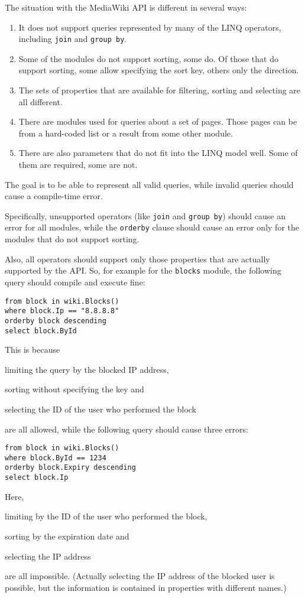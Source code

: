 The situation with the MediaWiki \ac{API} is different in several ways:

\begin{enumerate}
\item It does not support queries represented by many of the LINQ operators, including \lstinline{join} and \lstinline{group by}.
\item Some of the modules do not support sorting, some do. Of those that do support sorting, some allow specifying the sort key, others only the direction.
\item The sets of properties that are available for filtering, sorting and selecting are all different.
\item There are modules used for queries about a set of pages. Those pages can be from a hard-coded list or a result from some other module.
\item There are also parameters that do not fit into the LINQ model well. Some of them are required, some are not.
\end{enumerate}

The goal is to be able to represent all valid queries, while invalid queries should cause a compile-time error.

Specifically, unsupported operators (like \lstinline{join} and \lstinline{group by}) should cause an error for all modules,
while the \lstinline{orderby} clause should cause an error only for the modules that do not support sorting.

Also, all operators should support only those properties that are actually supported by the \ac{API}.
So, for example for the \verb,blocks, module, the following query should compile and execute fine:

\begin{lstlisting}
from block in wiki.Blocks()
where block.Ip == "8.8.8.8"
orderby block descending
select block.ById
\end{lstlisting}

This is because
\begin{compactitem}
\item limiting the query by the blocked \ac{IP} address,
\item sorting without specifying the key and
\item selecting the ID of the user who performed the block
\end{compactitem}
are all allowed, while the following query should cause three errors:

\begin{lstlisting}
from block in wiki.Blocks()
where block.ById == 1234
orderby block.Expiry descending
select block.Ip
\end{lstlisting}

Here,
\begin{compactitem}
\item limiting by the ID of the user who performed the block,
\item sorting by the expiration date and
\item selecting the \ac{IP} address
\end{compactitem}
are all impossible.
(Actually selecting the \ac{IP} address of the blocked user is possible,
but the information is contained in properties with different names.)